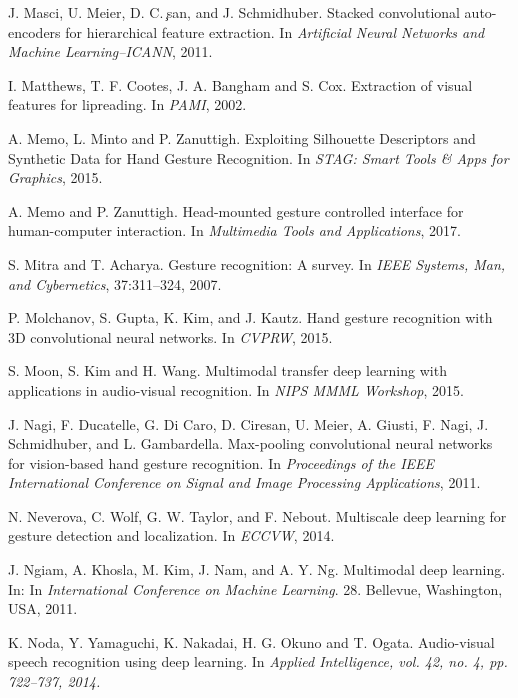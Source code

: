 \begin{thebibliography}{99}
  J. Masci, U. Meier, D. C. ̧san, and J. Schmidhuber.
  Stacked convolutional auto-encoders for hierarchical feature extraction.
  In \textit{Artificial Neural Networks and Machine Learning–ICANN}, 2011.

  I. Matthews, T. F. Cootes, J. A. Bangham and S. Cox. Extraction of visual
  features for lipreading. In \textit{PAMI}, 2002.

  A. Memo, L. Minto and P. Zanuttigh.  Exploiting Silhouette Descriptors and
  Synthetic Data for Hand Gesture Recognition. In \textit{STAG: Smart
    Tools \& Apps for Graphics}, 2015.

  A. Memo and P. Zanuttigh. Head-mounted gesture controlled interface
  for human-computer interaction. In \textit{Multimedia Tools and
  Applications}, 2017.

  S. Mitra and T. Acharya. Gesture recognition: A survey. 
  In \textit{IEEE Systems, Man, and Cybernetics}, 37:311–324, 2007. 

  P. Molchanov, S. Gupta, K. Kim, and J. Kautz. Hand gesture recognition 
  with 3D convolutional neural networks. In \textit{CVPRW}, 2015.

  S. Moon, S. Kim and H. Wang. Multimodal transfer deep learning with
    applications in audio-visual recognition. In \textit{NIPS MMML
    Workshop}, 2015.

  J. Nagi, F. Ducatelle, G. Di Caro, D. Ciresan, U. Meier, A. Giusti,
  F. Nagi, J. Schmidhuber, and L. Gambardella.
  Max-pooling convolutional neural networks for vision-based hand 
  gesture recognition.
  In \textit{Proceedings of the IEEE International Conference on
  Signal and Image Processing Applications}, 2011.

  N. Neverova, C. Wolf, G. W. Taylor, and F. Nebout.  Multiscale deep
  learning for gesture detection and localization. In \textit{ECCVW}, 2014.

  J. Ngiam, A. Khosla, M. Kim, J. Nam, and A. Y. Ng. 
  Multimodal deep learning. In:
  In \textit{International Conference on Machine Learning}.  28. 
  Bellevue, Washington, USA, 2011.

  K. Noda, Y. Yamaguchi, K. Nakadai, H. G. Okuno and T. Ogata. Audio-visual
  speech recognition using deep learning.  In \textit{Applied Intelligence,
  vol. 42, no. 4, pp. 722–737, 2014.}


\end{thebibliography}
